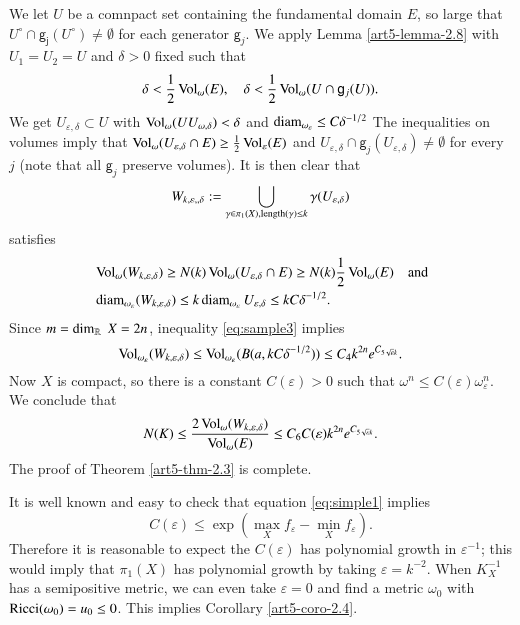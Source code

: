 We let $U$ be a  comnpact set containing the fundamental domain $E$, so large that $U^{\circ} \cap\mathsf{g_{j}}(U^{\circ}) \neq \emptyset$ for each generator $\mathsf{g}_{j}$. We apply Lemma \ref{art5-lemma-2.8} with $U_{1} = U_{2} =U$ and $\delta > 0$ fixed such that
$$
\delta < \dfrac{1}{2}\operatorname{Vol}_{\omega}(E), \quad \delta < \dfrac{1}{2}\operatorname{Vol}_{\omega}(U\cap\mathsf{g}_{j}(U)).
$$
We get $U_{\varepsilon,\delta} \subset U$ with $\operatorname{Vol}_{\omega}(U U_{\omega, \delta}) < \delta$ and $\operatorname{diam}_{\omega_{\varepsilon}} \leq C\delta^{-1/2}$ The inequalities on volumes imply that $\operatorname{Vol}_{\omega}(U_{\varepsilon, \delta} \cap E) \geq \frac{1}{2}\operatorname{Vol}_{\varepsilon}(E)$ and $U_{\varepsilon,\delta} \cap \mathsf{g}_{j}(U_{\varepsilon, \delta}) \neq \emptyset$ for every $j$ (note that all $\mathsf{g}_{j}$ preserve volumes). It is then clear that
$$
W_{k,\varepsilon,,\delta}: = \bigcup\limits_{\gamma \in \pi_{1}(X), \operatorname{length}(\gamma)\leq k} \gamma (U_{\varepsilon, \delta})
$$
satisfies
\begin{align*}
&\operatorname{Vol}_{\omega}(W_{k,\varepsilon, \delta}) \geq N(k)\operatorname{Vol}_{\omega}(U_{\varepsilon, \delta} \cap E) \geq N(k)\frac{1}{2}\operatorname{Vol}_    {\omega}(E) \quad \text{\rm and}\\
&\operatorname{diam}_{\omega_{\varepsilon}}(W_{k,\varepsilon,\delta}) \leq k \operatorname{diam}_{\omega_{\varepsilon}}U_{\varepsilon, \delta}\leq      kC\delta^{-1/2}.
\end{align*}
Since $m=\dim_{\mathbb{R}}\; X=2n$, inequality \eqref{eq:sample3} implies
$$
\operatorname{Vol}_{\omega_{\varepsilon}}(W_{k, \varepsilon, \delta}) \leq \operatorname{Vol}_{\omega_{\varepsilon}}(B(a, kC\delta^{-1/2})) \leq C_{4}k^{2n}e^{C_{5\sqrt{\varepsilon}k}}.
$$ 
Now $X$ is compact, so there is a constant $C(\varepsilon) > 0$ such that $\omega^{n} \leq C(\varepsilon)\omega_{\varepsilon}^{n}$. We conclude that
$$
N(K)\leq \dfrac{2\operatorname{Vol}_{\omega}(W_{k,\varepsilon,\delta})}{\operatorname{Vol}_{\omega}(E)} \leq C_{6}C(\varepsilon)k^{2n}e^{C_{5 \sqrt{\varepsilon}k}}.
$$
The proof of Theorem \ref{art5-thm-2.3} is complete.

\begin{remark}
It is well known and easy to check that equation \eqref{eq:simple1} implies 
$$
C(\varepsilon) \leq \exp \left(\max\limits_{X} f_{\varepsilon} - \min\limits_{X}f_{\varepsilon}\right).
$$
Therefore it is reasonable to expect the $C(\varepsilon)$ has polynomial growth in $\varepsilon^{-1}$; this would imply that $\pi_{1}(X)$ has polynomial growth by taking $\varepsilon = k^{-2}$. When $K_{X}^{-1}$ has a semipositive metric, we can even take $\varepsilon = 0$ and find a metric $\omega_{0}$ with $\operatorname{Ricci}(\omega_{0}) = u_{0} \leq 0$. This implies Corollary \ref{art5-coro-2.4}.
\end{remark}

